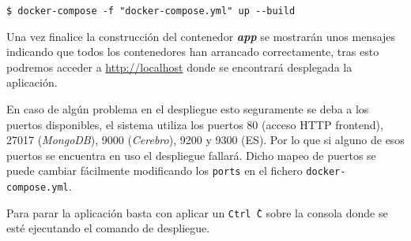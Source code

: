 \begin{lstlisting}[style=Consola, caption=Comando para desplegar el sistema]
$ docker-compose -f "docker-compose.yml" up --build
\end{lstlisting}

Una vez finalice la construcción del contenedor \textbf{\textit{app}} se mostrarán unos mensajes indicando que todos los contenedores han arrancado correctamente, tras esto podremos acceder a \url{http://localhost} donde se encontrará desplegada la aplicación.

En caso de algún problema en el despliegue esto seguramente se deba a los puertos disponibles, el sistema utiliza los puertos 80 (acceso \acrshort{HTTP} \gls{frontend}), 27017 (\textit{MongoDB}), 9000 (\textit{Cerebro}), 9200 y 9300 (\acrlong{ES}). Por lo que si alguno de esos puertos se encuentra en uso el despliegue fallará. Dicho mapeo de puertos se puede cambiar fácilmente modificando los \texttt{ports} en el fichero \texttt{docker-compose.yml}.


Para parar la aplicación basta con aplicar un \texttt{Ctrl\^\ C} sobre la consola donde se esté ejecutando el comando de despliegue.


